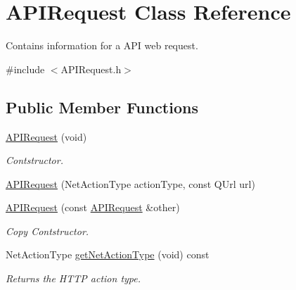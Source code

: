 \hypertarget{class_a_p_i_request}{}\section{A\+P\+I\+Request Class Reference}
\label{class_a_p_i_request}


Contains information for a A\+PI web request.  




{\ttfamily \#include $<$A\+P\+I\+Request.\+h$>$}

\subsection*{Public Member Functions}
\begin{DoxyCompactItemize}
\item 
\mbox{\label{class_a_p_i_request_aa1b6f8f309547967edbfc2f6636df3a4}} 
\hyperlink{class_a_p_i_request_aa1b6f8f309547967edbfc2f6636df3a4}{A\+P\+I\+Request} (void)
\begin{DoxyCompactList}\small\item\em Contstructor. \end{DoxyCompactList}\item 
\hyperlink{class_a_p_i_request_a5c6b7f4e52cf0d36bd3bb2280ab59331}{A\+P\+I\+Request} (Net\+Action\+Type action\+Type, const Q\+Url url)
\item 
\mbox{\label{class_a_p_i_request_a0b237561a193b67440be9787117f90d1}} 
\hyperlink{class_a_p_i_request_a0b237561a193b67440be9787117f90d1}{A\+P\+I\+Request} (const \hyperlink{class_a_p_i_request}{A\+P\+I\+Request} \&other)
\begin{DoxyCompactList}\small\item\em Copy Contstructor. \end{DoxyCompactList}\item 
\mbox{\label{class_a_p_i_request_ae2d4cf9cce8e40de3158b681d4402551}} 
Net\+Action\+Type \hyperlink{class_a_p_i_request_ae2d4cf9cce8e40de3158b681d4402551}{get\+Net\+Action\+Type} (void) const
\begin{DoxyCompactList}\small\item\em Returns the H\+T\+TP action type. \end{DoxyCompactList}\item 
\mbox{\label{class_a_p_i_request_ab4f5dc1d54250fc927872cfcc59cc3cc}} 

\end{DoxyCompactItemize}
